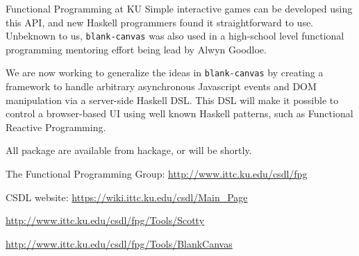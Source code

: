 \begin{hcarentry}[section]{Functional Programming at KU}
Simple interactive games can be developed using this API,
and new Haskell programmers found it straightforward to use.
Unbeknown to us, {\tt blank-canvas} was also used in a high-school
level functional programming mentoring effort being lead by Alwyn Goodloe.

We are now working to generalize the ideas in {\tt blank-canvas} by
creating a framework to handle arbitrary asynchronous Javascript events
and DOM manipulation via a server-side Haskell DSL. This DSL will make it possible to control
a browser-based UI using well known Haskell patterns, such as Functional
Reactive Programming.

All package are available from hackage, or will be shortly.

\FurtherReading
\begin{compactitem}
\item   The Functional Programming Group:
    \url{http://www.ittc.ku.edu/csdl/fpg}
\item
  CSDL website: \url{https://wiki.ittc.ku.edu/csdl/Main_Page}
\item \url{http://www.ittc.ku.edu/csdl/fpg/Tools/Scotty}
\item \url{http://www.ittc.ku.edu/csdl/fpg/Tools/BlankCanvas}
\end{compactitem}
\end{hcarentry}
